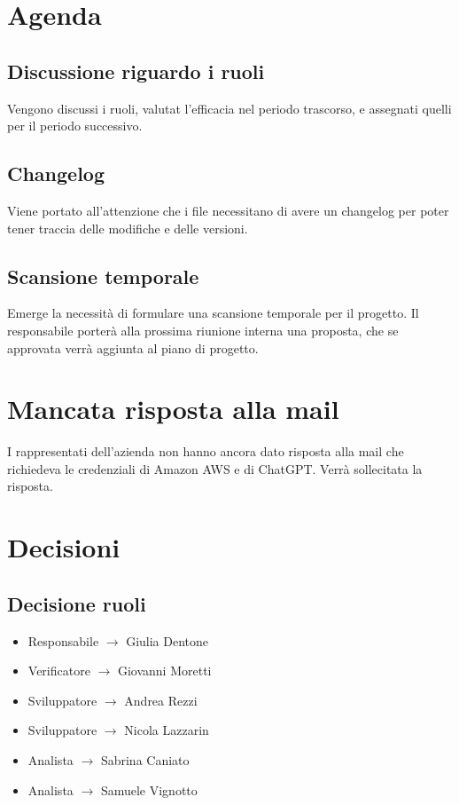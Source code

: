 \documentclass{article}
\begin{document}
\section{Agenda}
\subsection{Discussione riguardo i ruoli}
Vengono discussi i ruoli, valutat l'efficacia nel periodo trascorso, e assegnati quelli per il periodo successivo.
\subsection{Changelog}
Viene portato all'attenzione che i file necessitano di avere un changelog per poter tener traccia delle modifiche e delle versioni.
\subsection{Scansione temporale}
Emerge la necessità di formulare una scansione temporale per il progetto. Il responsabile porterà alla prossima riunione interna una proposta, che se approvata verrà aggiunta al piano di progetto.
\section{Mancata risposta alla mail}
I rappresentati dell'azienda non hanno ancora dato risposta alla mail che richiedeva le credenziali di Amazon AWS e di ChatGPT. Verrà sollecitata la risposta.
\section{Decisioni}
\subsection{Decisione ruoli}
\begin{itemize}[label={}, noitemsep]
    \item Responsabile $\rightarrow$ Giulia Dentone
    \item Verificatore $\rightarrow$ Giovanni Moretti
    \item Sviluppatore $\rightarrow$ Andrea Rezzi
    \item Sviluppatore $\rightarrow$ Nicola Lazzarin
    \item Analista $\rightarrow$ Sabrina Caniato
    \item Analista $\rightarrow$ Samuele Vignotto
\end{itemize}
\end{document}

